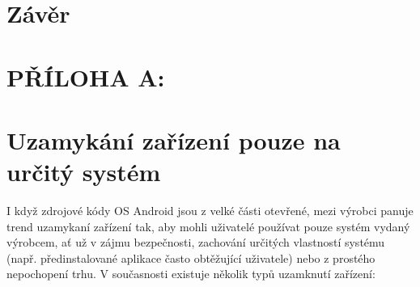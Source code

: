 \documentclass[12pt, a4paper, oneside]{article}
\begin{document}
\newpage
\section*{Závěr}



\newpage
\section*{PŘÍLOHA A:}
\section*{Uzamykání zařízení pouze na určitý systém}
\label{sec:locked}
I když zdrojové kódy OS Android jsou z velké části otevřené, mezi výrobci panuje trend uzamykaní zařízení tak, aby mohli uživatelé používat pouze systém vydaný výrobcem, ať už v zájmu bezpečnosti, zachování určitých vlastností systému (např. předinstalované aplikace často obtěžující uživatele) nebo z prostého nepochopení trhu. V současnosti existuje několik typů uzamknutí zařízení:
\end{document}
